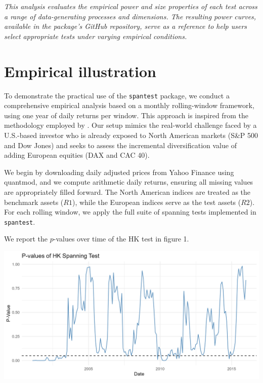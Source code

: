 \emph{This analysis evaluates the empirical power and size properties of each
test across a range of data-generating processes and dimensions. The
resulting power curves, available in the package's GitHub repository,
serve as a reference to help users select appropriate tests under
varying empirical conditions.}

\section{Empirical illustration}\label{empirical-illustration}

To demonstrate the practical use of the \texttt{spantest} package, we conduct a
comprehensive empirical analysis based on a monthly rolling-window
framework, using one year of daily returns per window. This approach is
inspired from the methodology employed by \citet{GungorLuger2016}. Our setup
mimics the real-world challenge faced by a U.S.-based investor who is
already exposed to North American markets (S\&P 500 and Dow Jones) and
seeks to assess the incremental diversification value of adding European
equities (DAX and CAC 40).

We begin by downloading daily adjusted prices from Yahoo Finance using
quantmod, and we compute arithmetic daily returns, ensuring all missing
values are appropriately filled forward. The North American indices are
treated as the benchmark assets (\(R1\)), while the European indices serve
as the test assets (\(R2\)). For each rolling window, we apply the full
suite of spanning tests implemented in \texttt{spantest}.

We report the \(p\)-values over time of the HK test in figure 1.

\begin{center}\includegraphics[width=1\linewidth]{figures/fig_hk_pvals} \end{center}

